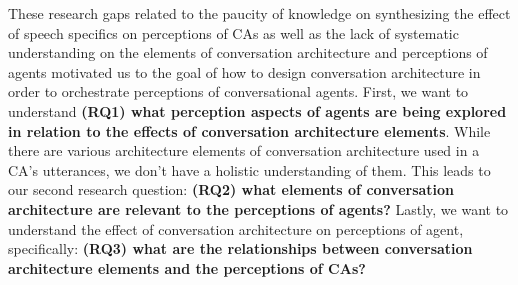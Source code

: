 

These research gaps related to the paucity of knowledge on synthesizing the effect of speech specifics on perceptions of CAs as well as the lack of systematic understanding on the elements of conversation architecture and perceptions of agents motivated us to the goal of how to design conversation architecture in order to orchestrate perceptions of conversational agents. First, we want to understand \textbf{(RQ1) what perception aspects of agents are being explored in relation to the effects of conversation architecture elements}. While there are various architecture elements of conversation architecture used in a CA's utterances, we don't have a holistic understanding of them. This leads to our second research question: \textbf{(RQ2) what elements of conversation architecture are relevant to the perceptions of agents?} Lastly, we want to understand the effect of conversation architecture on perceptions of agent, specifically: \textbf{(RQ3) what are the relationships between conversation architecture elements and the perceptions of CAs?}

